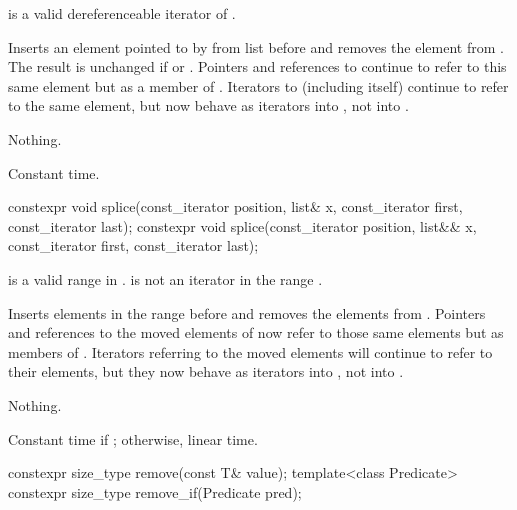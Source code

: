 \begin{itemdescr}
\pnum
\expects
{} is a valid dereferenceable iterator of .

\pnum
\effects
Inserts an element pointed to by
from list
before  and removes the element from
.
The result is unchanged if
or
.
Pointers and references to
continue to refer to this same element but as a member of
.
Iterators
to
(including
itself) continue to refer to the same element, but now behave as iterators into
,
not into
.

\pnum
\throws
Nothing.

\pnum
\complexity
Constant time.
\end{itemdescr}

%
\begin{itemdecl}
constexpr void splice(const_iterator position, list& x,
                      const_iterator first, const_iterator last);
constexpr void splice(const_iterator position, list&& x,
                      const_iterator first, const_iterator last);
\end{itemdecl}

\begin{itemdescr}
\pnum
\expects
\tcode{[first, last)} is a valid range in .
 is not an iterator in the range .

\pnum
\effects
Inserts elements in the range
before
and removes the elements from
.
Pointers and references to the moved elements of
now refer to those same elements but as members of
.
Iterators referring to the moved elements will continue to refer to their
elements, but they now behave as iterators into
,
not into
.

\pnum
\throws
Nothing.

\pnum
\complexity
Constant time if
;
otherwise, linear time.
\end{itemdescr}

%
\begin{itemdecl}
constexpr size_type remove(const T& value);
template<class Predicate> constexpr size_type remove_if(Predicate pred);
\end{itemdecl}

